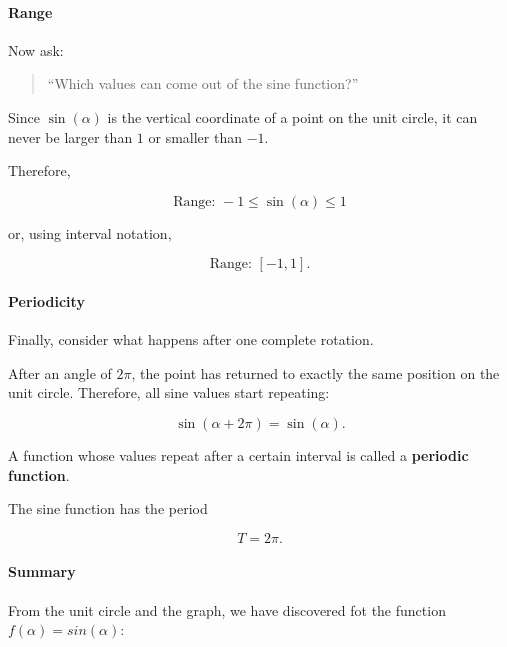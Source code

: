 \documentclass[a4paper,11pt]{article}
\begin{document}
\paragraph{Range}

Now ask:

\begin{quote}
    ``Which values can come out of the sine function?''
\end{quote}

Since $\sin(\alpha)$ is the vertical coordinate of a point on the unit
circle, it can never be larger than $1$ or smaller than $-1$.

Therefore,

\begin{equation}
    \boxed{\text{Range: } -1 \leq \sin(\alpha) \leq 1}
\end{equation}

or, using interval notation,

\begin{equation}
    \boxed{\text{Range: } [-1,1]}.
\end{equation}

\paragraph{Periodicity}

Finally, consider what happens after one complete rotation.

After an angle of $2\pi$, the point has returned to exactly the same
position on the unit circle. Therefore, all sine values start repeating:

\begin{equation}
    \boxed{\sin(\alpha+2\pi)=\sin(\alpha)}.
\end{equation}

A function whose values repeat after a certain interval is called a
\textbf{periodic function}.

The sine function has the period

\begin{equation}
    \boxed{T=2\pi}.
\end{equation}

\paragraph{Summary}

From the unit circle and the graph, we have discovered fot the function $f(\alpha)= sin(\alpha)$:
\end{document}
